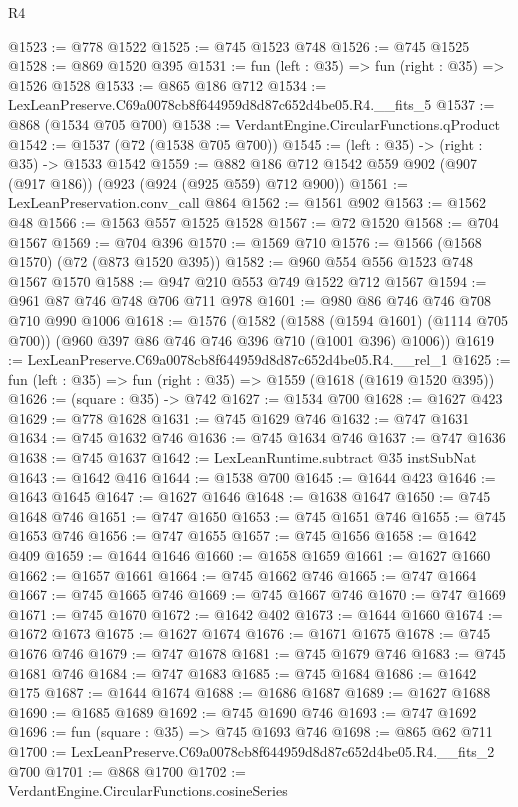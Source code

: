 \begin{lexlean}{R4}
\begin{coremodule}
@1523 := @778 @1522
@1525 := @745 @1523 @748
@1526 := @745 @1525
@1528 := @869 @1520 @395
@1531 := fun (left : @35) => fun (right : @35) => @1526 @1528
@1533 := @865 @186 @712
@1534 := LexLeanPreserve.C69a0078cb8f644959d8d87c652d4be05.R4.__fits_5
@1537 := @868 (@1534 @705 @700)
@1538 := VerdantEngine.CircularFunctions.qProduct
@1542 := @1537 (@72 (@1538 @705 @700))
@1545 := (left : @35) -> (right : @35) -> @1533 @1542
@1559 := @882 @186 @712 @1542 @559 @902 (@907 (@917 @186)) (@923 (@924 (@925 @559) @712 @900))
@1561 := LexLeanPreservation.conv_call @864
@1562 := @1561 @902
@1563 := @1562 @48
@1566 := @1563 @557 @1525 @1528
@1567 := @72 @1520
@1568 := @704 @1567
@1569 := @704 @396
@1570 := @1569 @710
@1576 := @1566 (@1568 @1570) (@72 (@873 @1520 @395))
@1582 := @960 @554 @556 @1523 @748 @1567 @1570
@1588 := @947 @210 @553 @749 @1522 @712 @1567
@1594 := @961 @87 @746 @748 @706 @711 @978
@1601 := @980 @86 @746 @746 @708 @710 @990 @1006
@1618 := @1576
    (@1582
      (@1588 (@1594 @1601) (@1114 @705 @700))
      (@960 @397 @86 @746 @746 @396 @710 (@1001 @396) @1006))
@1619 := LexLeanPreserve.C69a0078cb8f644959d8d87c652d4be05.R4.__rel_1
@1625 := fun (left : @35) => fun (right : @35) => @1559 (@1618 (@1619 @1520 @395))
@1626 := (square : @35) -> @742
@1627 := @1534 @700
@1628 := @1627 @423
@1629 := @778 @1628
@1631 := @745 @1629 @746
@1632 := @747 @1631
@1634 := @745 @1632 @746
@1636 := @745 @1634 @746
@1637 := @747 @1636
@1638 := @745 @1637
@1642 := LexLeanRuntime.subtract @35 instSubNat
@1643 := @1642 @416
@1644 := @1538 @700
@1645 := @1644 @423
@1646 := @1643 @1645
@1647 := @1627 @1646
@1648 := @1638 @1647
@1650 := @745 @1648 @746
@1651 := @747 @1650
@1653 := @745 @1651 @746
@1655 := @745 @1653 @746
@1656 := @747 @1655
@1657 := @745 @1656
@1658 := @1642 @409
@1659 := @1644 @1646
@1660 := @1658 @1659
@1661 := @1627 @1660
@1662 := @1657 @1661
@1664 := @745 @1662 @746
@1665 := @747 @1664
@1667 := @745 @1665 @746
@1669 := @745 @1667 @746
@1670 := @747 @1669
@1671 := @745 @1670
@1672 := @1642 @402
@1673 := @1644 @1660
@1674 := @1672 @1673
@1675 := @1627 @1674
@1676 := @1671 @1675
@1678 := @745 @1676 @746
@1679 := @747 @1678
@1681 := @745 @1679 @746
@1683 := @745 @1681 @746
@1684 := @747 @1683
@1685 := @745 @1684
@1686 := @1642 @175
@1687 := @1644 @1674
@1688 := @1686 @1687
@1689 := @1627 @1688
@1690 := @1685 @1689
@1692 := @745 @1690 @746
@1693 := @747 @1692
@1696 := fun (square : @35) => @745 @1693 @746
@1698 := @865 @62 @711
@1700 := LexLeanPreserve.C69a0078cb8f644959d8d87c652d4be05.R4.__fits_2 @700
@1701 := @868 @1700
@1702 := VerdantEngine.CircularFunctions.cosineSeries

\end{coremodule}
\end{lexlean}
